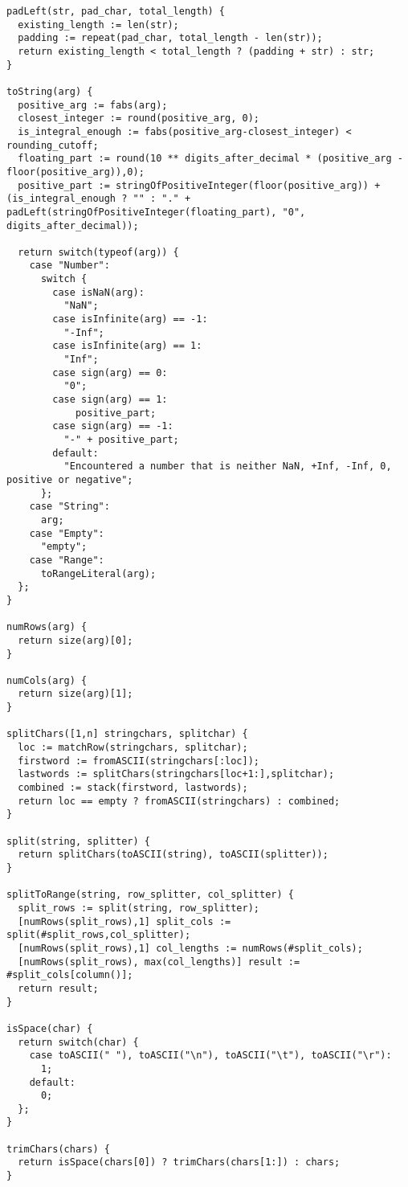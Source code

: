 \begin{lstlisting}
padLeft(str, pad_char, total_length) {
  existing_length := len(str);
  padding := repeat(pad_char, total_length - len(str));
  return existing_length < total_length ? (padding + str) : str;
}

toString(arg) {
  positive_arg := fabs(arg);
  closest_integer := round(positive_arg, 0);
  is_integral_enough := fabs(positive_arg-closest_integer) < rounding_cutoff;
  floating_part := round(10 ** digits_after_decimal * (positive_arg - floor(positive_arg)),0);
  positive_part := stringOfPositiveInteger(floor(positive_arg)) + (is_integral_enough ? "" : "." + padLeft(stringOfPositiveInteger(floating_part), "0", digits_after_decimal));

  return switch(typeof(arg)) {
    case "Number":
      switch {
        case isNaN(arg):
          "NaN";
        case isInfinite(arg) == -1:
          "-Inf";
        case isInfinite(arg) == 1:
          "Inf";
        case sign(arg) == 0:
          "0";
        case sign(arg) == 1:
            positive_part;
        case sign(arg) == -1:
          "-" + positive_part;
        default:
          "Encountered a number that is neither NaN, +Inf, -Inf, 0, positive or negative";
      };
    case "String":
      arg;
    case "Empty":
      "empty";
    case "Range":
      toRangeLiteral(arg);
  };
}

numRows(arg) {
  return size(arg)[0];
}

numCols(arg) {
  return size(arg)[1];
}

splitChars([1,n] stringchars, splitchar) {
  loc := matchRow(stringchars, splitchar);
  firstword := fromASCII(stringchars[:loc]);
  lastwords := splitChars(stringchars[loc+1:],splitchar);
  combined := stack(firstword, lastwords);
  return loc == empty ? fromASCII(stringchars) : combined;
}

split(string, splitter) {
  return splitChars(toASCII(string), toASCII(splitter));
}

splitToRange(string, row_splitter, col_splitter) {
  split_rows := split(string, row_splitter);
  [numRows(split_rows),1] split_cols := split(#split_rows,col_splitter);
  [numRows(split_rows),1] col_lengths := numRows(#split_cols);
  [numRows(split_rows), max(col_lengths)] result := #split_cols[column()];
  return result;
}

isSpace(char) {
  return switch(char) {
    case toASCII(" "), toASCII("\n"), toASCII("\t"), toASCII("\r"):
      1;
    default:
      0;
  };
}

trimChars(chars) {
  return isSpace(chars[0]) ? trimChars(chars[1:]) : chars;
}


\end{lstlisting}
